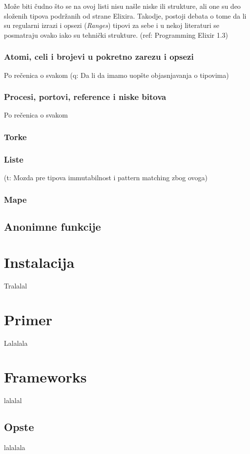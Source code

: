 \documentclass[a4paper]{article}
\begin{document}
Može biti čudno što se na ovoj listi nisu našle niske ili strukture, ali one su deo složenih tipova podržanih od strane Elixira. Takodje, postoji debata o tome da li su regularni izrazi i opsezi (\textit{Ranges}) tipovi za sebe i u nekoj literaturi se posmatraju ovako iako su tehnički strukture. (ref: Programming Elixir 1.3)

\subsubsection{Atomi, celi i brojevi u pokretno zarezu i opsezi}
\label{sec:ime}
Po rečenica o svakom (q: Da li da imamo uopšte objasnjavanja o tipovima)
\subsubsection{Procesi, portovi, reference i niske bitova}
\label{sec:ime}
Po rečenica o svakom
\subsubsection{Torke}
\label{sec:ime}

\subsubsection{Liste}
\label{sec:ime}
(t: Mozda pre tipova immutabilnost i pattern matching zbog ovoga)
\subsubsection{Mape}
\label{sec:ime}

\subsection{Anonimne funkcije}
\label{sec:ime}

\section{Instalacija}
Tralalal

\section{Primer}
Lalalala

\section{Frameworks}
lalalal
\subsection{Opste}
lalalala
\end{document}
